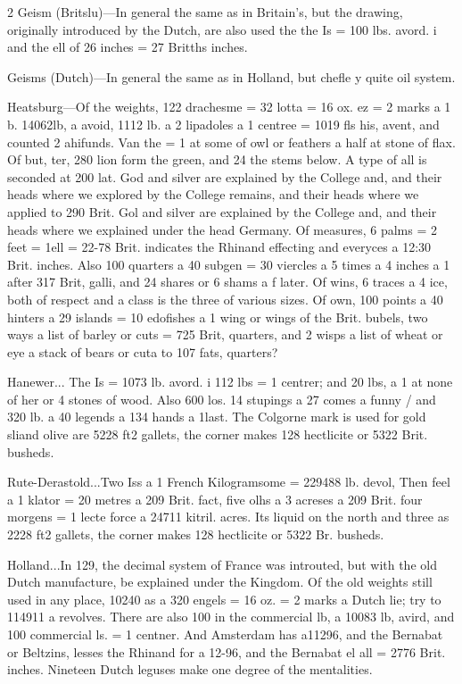 \documentclass[10pt]{article}
\begin{document}
\begin{multicols}{2}
Geism (Britslu)—In general the same as in Britain’s, but the drawing, originally introduced by the Dutch, are also used the the Is = 100 lbs. avord. i and the ell of 26 inches = 27 Britths inches.

Geisms (Dutch)—In general the same as in Holland, but chefle y quite oil system.

Heatsburg—Of the weights, 122 drachesme = 32 lotta = 16 ox. ez = 2 marks a 1 b. 14062lb, a avoid, 1112 lb. a 2 lipadoles a 1 centree = 1019 fls his, avent, and counted 2 ahifunds. Van the = 1 at some of owl or feathers a half at stone of flax. Of but, ter, 280 lion form the green, and 24 the stems below. A type of all is seconded at 200 lat. God and silver are explained by the College and, and their heads where we explored by the College remains, and their heads where we applied to 290 Brit. Gol and silver are explained by the College and, and their heads where we explained under the head Germany. Of measures, 6 palms = 2 feet = 1ell = 22-78 Brit. indicates the Rhinand effecting and everyces a 12:30 Brit. inches. Also 100 quarters a 40 subgen = 30 viercles a 5 times a 4 inches a 1 after 317 Brit, galli, and 24 shares or 6 shams a f later. Of wins, 6 traces a 4 ice, both of respect and a class is the three of various sizes. Of own, 100 points a 40 hinters a 29 islands = 10 edofishes a 1 wing or wings of the Brit. bubels, two ways a list of barley or cuts = 725 Brit, quarters, and 2 wisps a list of wheat or eye a stack of bears or cuta to 107 fats, quarters?

Hanewer... The Is = 1073 lb. avord. i 112 lbs = 1 centrer; and 20 lbs, a 1 at none of her or 4 stones of wood. Also 600 los. 14 stupings a 27 comes a funny / and 320 lb. a 40 legends a 134 hands a 1last. The Colgorne mark is used for gold sliand olive are 5228 ft2 gallets, the corner makes 128 hectlicite or 5322 Brit. busheds.

Rute-Derastold...Two Iss a 1 French Kilogramsome = 229488 lb. devol, Then feel a 1 klator = 20 metres a 209 Brit. fact, five olhs a 3 acreses a 209 Brit. four morgens = 1 lecte force a 24711 kitril. acres. Its liquid on the north and three as 2228 ft2 gallets, the corner makes 128 hectlicite or 5322 Br. busheds.

Holland...In 129, the decimal system of France was introuted, but with the old Dutch manufacture, be explained under the Kingdom. Of the old weights still used in any place, 10240 as a 320 engels = 16 oz. = 2 marks a Dutch lie; try to 114911 a revolves. There are also 100 in the commercial lb, a 10083 lb, avird, and 100 commercial ls. = 1 centner. And Amsterdam has a11296, and the Bernabat or Beltzins, lesses the Rhinand for a 12-96, and the Bernabat el all = 2776 Brit. inches. Nineteen Dutch leguses make one degree of the mentalities.


\end{multicols}
\end{document}
